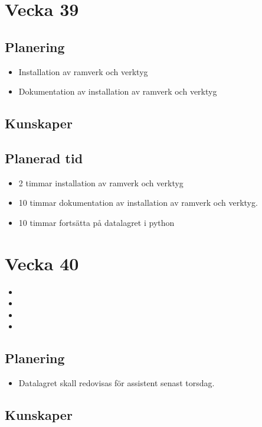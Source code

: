 \documentclass{TDP003mall}
\begin{document}
\section{Vecka 39}

\subsection{Planering}
\begin{itemize}
\item Installation av ramverk och verktyg
\item Dokumentation av installation av ramverk och verktyg
\end{itemize}

\subsection{Kunskaper}

\subsection{Planerad tid}
\begin{itemize}
\item 2 timmar installation av ramverk och verktyg
\item 10 timmar dokumentation av installation av ramverk och verktyg.
\item 10 timmar fortsätta på datalagret i python   
\end{itemize}


\section{Vecka 40}
\begin{itemize}
\item
\item
\item  
\item
\end{itemize}

\subsection{Planering}
\begin{itemize}
\item Datalagret skall redovisas för assistent senast torsdag.
\end{itemize}

\subsection{Kunskaper}
\end{document}
